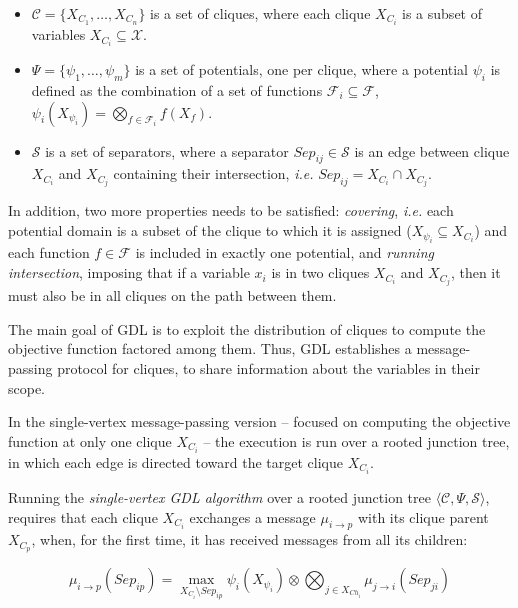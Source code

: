 \documentclass[11pt, twoside, titlepage, a4paper, openright]{report}
\begin{document}
\begin{itemize}
\item $\mathcal{C} = \{X_{C_1},\ldots,X_{C_n}\}$ is a set of cliques, where each clique $X_{C_i}$ is a subset of variables $X_{C_i}\subseteq\mathcal{X}$.
\item $\Psi = \{\psi_1,\ldots,\psi_m\}$ is a set of potentials, one per clique, where a potential $\psi_i$ is defined as the combination of a set of functions $\mathcal{F}_i \subseteq \mathcal{F}$, $\psi_i(X_{\psi_i}) = \bigotimes_{f\in\mathcal{F}_i} f(X_f)$.
\item $\mathcal{S}$ is a set of separators, where a separator $Sep_{ij} \in \mathcal{S}$ is an edge between clique $X_{C_i}$ and $X_{C_j}$ containing their intersection, \textit{i.e.} $Sep_{ij} = X_{C_i} \cap X_{C_j}$.
\end{itemize}

\noindent In addition, two more properties needs to be satisfied: \textit{covering}, \textit{i.e.} each potential domain is a subset of the clique to which it is assigned ($X_{\psi_i} \subseteq X_{C_i}$) and each function $f \in \mathcal{F}$ is included in exactly one potential, and \textit{running intersection}, imposing that if a variable $x_i$ is in two cliques $X_{C_i}$ and $X_{C_j}$, then it must also be in all cliques on the path between them.

\noindent The main goal of GDL is to exploit the distribution of cliques to compute the objective function factored among them. Thus, GDL establishes a message-passing protocol for cliques, to share information about the variables in their scope. 

\noindent In the single-vertex message-passing version -- focused on computing the objective function at only one clique $X_{C_i}$ -- the execution is run over a rooted junction tree, in which each edge is directed toward the target clique $X_{C_i}$.

\noindent Running the \textit{single-vertex GDL algorithm} over a rooted junction tree $\langle\mathcal{C}, \Psi, \mathcal{S}\rangle$, requires that each clique $X_{C_i}$ exchanges a message $\mu_{i \to p}$ with its clique parent $X_{C_p}$, when, for the first time, it has received messages from all its children:

\begin{equation}\label{eq:msg}\mu_{i \to p}(Sep_{ip})=\operatorname*{max}_{X_{C_i} \setminus Sep_{ip}}\psi_i(X_{\psi_i})\otimes\bigotimes_{j \in X_{Ch_i}}\mu_{j \to i}(Sep_{ji})\end{equation}
\end{document}

